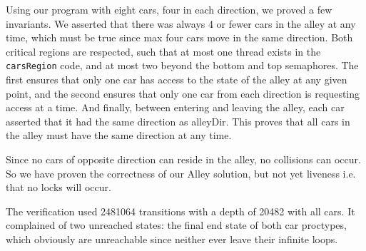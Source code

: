 Using our program with eight cars, four in each direction, we proved a few invariants. We asserted that there was always 4 or fewer cars in the alley at any time, which must be true since max four cars move in the same direction. Both critical regions are respected, such that at most one thread exists in the \texttt{carsRegion} code, and at most two beyond the bottom and top semaphores. The first ensures that only one car has access to the state of the alley at any given point, and the second ensures that only one car from each direction is requesting access at a time. And finally, between entering and leaving the alley, each car asserted that it had the same direction as alleyDir. This proves that all cars in the alley must have the same direction at any time.

Since no cars of opposite direction can reside in the alley, no collisions can occur. So we have proven the correctness of our Alley solution, but not yet liveness i.e. that no locks will occur.

The verification used 2481064 transitions with a depth of 20482 with all cars. It complained of two unreached states: the final end state of both car proctypes, which obviously are unreachable since neither ever leave their infinite loops.
